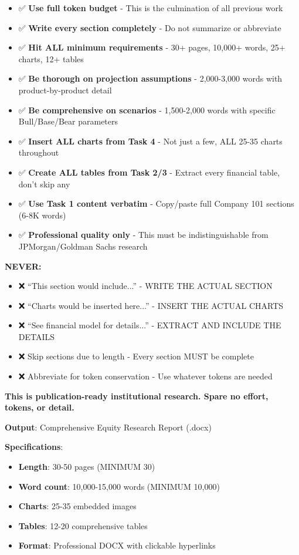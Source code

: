 \documentclass[11pt]{article}
\begin{document}
\begin{itemize}[leftmargin=*,itemsep=2pt,topsep=2pt]
\item {} ✅ \textbf{Use full token budget} - This is the culmination of all previous work
\item {} ✅ \textbf{Write every section completely} - Do not summarize or abbreviate
\item {} ✅ \textbf{Hit ALL minimum requirements} - 30+ pages, 10,000+ words, 25+ charts, 12+ tables
\item {} ✅ \textbf{Be thorough on projection assumptions} - 2,000-3,000 words with product-by-product detail
\item {} ✅ \textbf{Be comprehensive on scenarios} - 1,500-2,000 words with specific Bull/Base/Bear parameters
\item {} ✅ \textbf{Insert ALL charts from Task 4} - Not just a few, ALL 25-35 charts throughout
\item {} ✅ \textbf{Create ALL tables from Task 2/3} - Extract every financial table, don't skip any
\item {} ✅ \textbf{Use Task 1 content verbatim} - Copy/paste full Company 101 sections (6-8K words)
\item {} ✅ \textbf{Professional quality only} - This must be indistinguishable from JPMorgan/Goldman Sachs research
\end{itemize}

\textbf{NEVER:}

\begin{itemize}[leftmargin=*,itemsep=2pt,topsep=2pt]
\item {} ❌ ``This section would include...'' - WRITE THE ACTUAL SECTION
\item {} ❌ ``Charts would be inserted here...'' - INSERT THE ACTUAL CHARTS
\item {} ❌ ``See financial model for details...'' - EXTRACT AND INCLUDE THE DETAILS
\item {} ❌ Skip sections due to length - Every section MUST be complete
\item {} ❌ Abbreviate for token conservation - Use whatever tokens are needed
\end{itemize}

\textbf{This is publication-ready institutional research. Spare no effort, tokens, or detail.}


\textbf{Output}: Comprehensive Equity Research Report (.docx)


\textbf{Specifications}:

\begin{itemize}[leftmargin=*,itemsep=2pt,topsep=2pt]
\item {} \textbf{Length}: 30-50 pages (MINIMUM 30)
\item {} \textbf{Word count}: 10,000-15,000 words (MINIMUM 10,000)
\item {} \textbf{Charts}: 25-35 embedded images
\item {} \textbf{Tables}: 12-20 comprehensive tables
\item {} \textbf{Format}: Professional DOCX with clickable hyperlinks
\end{itemize}
\end{document}
